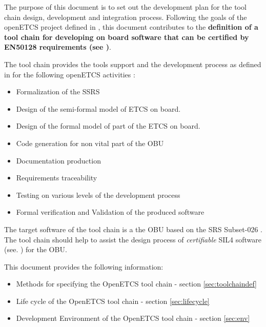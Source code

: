 The purpose of this document is to set out the development plan
for the tool chain design, development and integration process.
Following the goals of the openETCS project defined in \cite{FPP},
this document contributes to the {\bf definition of a tool chain 
 for developing on board  software that can be certified by EN50128
 requirements (see \cite{standard_railway_2011})}.

The tool chain provides the tools support and the development process as
defined in \cite{D2.6} for the following openETCS activities :
\begin{itemize}
\item Formalization of the \gls{SSRS} 
\item Design  of the semi-formal model of \gls{ETCS} on board.
\item Design of the formal model of part of the \gls{ETCS} on board.
\item Code generation for non vital part of the \gls{OBU}
\item Documentation production
\item Requirements traceability 
\item Testing on various levels of the development process
\item Formal verification and  Validation of the produced software

\end{itemize}

The target software of the tool chain is a the \gls{OBU} 
based on the \gls{SRS} Subset-026 \cite{unisig_subset-026_2012}.
The tool chain should help to assist the design process of {\em certifiable} \gls{SIL}4
software (see. \cite{D2.2}) for the \gls{OBU}. 

This document provides the following information:
\begin{itemize}
\item Methods for specifying the OpenETCS tool chain - section \ref{sec:toolchaindef}
\item Life cycle of the OpenETCS tool chain - section \ref{sec:lifecycle}
\item Development Environment of the OpenETCS tool chain - section \ref{sec:env}
\end{itemize}




